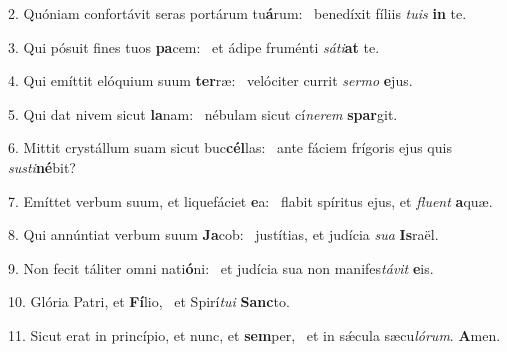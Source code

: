 2. Quóniam confortávit seras portárum tu\textbf{á}rum: \ast\  benedíxit fíliis \textit{tu}\textit{is} \textbf{in} te.\

3. Qui pósuit fines tuos \textbf{pa}cem: \ast\  et ádipe fruménti \textit{sá}\textit{ti}\textbf{at} te.\

4. Qui emíttit elóquium suum \textbf{ter}ræ: \ast\  velóciter currit \textit{ser}\textit{mo} \textbf{e}jus.\

5. Qui dat nivem sicut \textbf{la}nam: \ast\  nébulam sicut cí\textit{ne}\textit{rem} \textbf{spar}git.\

6. Mittit crystállum suam sicut buc\textbf{cél}las: \ast\  ante fáciem frígoris ejus quis \textit{sus}\textit{ti}\textbf{né}bit?\

7. Emíttet verbum suum, et liquefáciet \textbf{e}a: \ast\  flabit spíritus ejus, et \textit{flu}\textit{ent} \textbf{a}quæ.\

8. Qui annúntiat verbum suum \textbf{Ja}cob: \ast\  justítias, et judícia \textit{su}\textit{a} \textbf{Is}raël.\

9. Non fecit táliter omni nati\textbf{ó}ni: \ast\  et judícia sua non manifes\textit{tá}\textit{vit} \textbf{e}is.\

10. Glória Patri, et \textbf{Fí}lio, \ast\  et Spirí\textit{tu}\textit{i} \textbf{Sanc}to.\

11. Sicut erat in princípio, et nunc, et \textbf{sem}per, \ast\  et in sǽcula sæcu\textit{ló}\textit{rum}. \textbf{A}men.\


